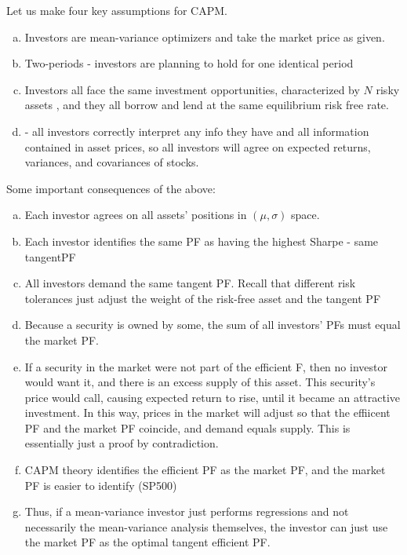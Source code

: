\documentclass[12pt]{scrartcl}
\begin{document}
\begin{note}
  Let us make four key assumptions for CAPM. 

  \begin{enumerate}[a.]
    \item Investors are mean-variance optimizers and take the market price as given.
    \item Two-periods - investors are planning to hold for one identical period 
    \item Investors all face the same investment opportunities, characterized by $N$ risky assets ,
    and they all borrow and lend at the same equilibrium risk free rate.
    \item {} - all investors correctly interpret 
    any info they have and all information contained in asset prices, so all investors 
    will agree on expected returns, variances, and covariances of stocks.
  \end{enumerate}
\end{note}

\begin{note}
  Some important consequences of the above:
  \begin{enumerate}[a.]
    \item Each investor agrees on all assets' positions in $(\mu, \sigma)$ space. 
    \item Each investor identifies the same PF as having the highest Sharpe - same tangentPF 
    \item All investors demand the same tangent PF. Recall that different risk tolerances just adjust the weight of the 
    risk-free asset and the tangent PF 
    \item Because a security is owned by some, the sum of all investors' PFs must 
    equal the market PF. 
    \item If a security in the market were not part of the efficient {F}, then no investor would want it, and there is an excess supply of this asset. 
    This security's price would call, causing expected return to rise, until it became an attractive investment. In this way, prices in the market 
    will adjust so that the effiicent PF and the market PF coincide, and demand equals supply. This is essentially just a proof by contradiction.
    \item CAPM theory identifies the efficient PF as the market PF, and the market PF is easier to identify (SP500)
    \item Thus, if a mean-variance investor just performs regressions and not necessarily the mean-variance analysis themselves, 
    the investor can just use the market PF as the optimal tangent efficient PF.  
  \end{enumerate}
\end{note}
\end{document}
